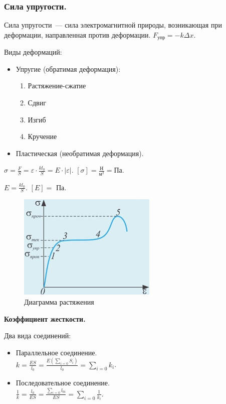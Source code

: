 \documentclass[12pt]{article}
\begin{document}
	\subsubsection{Сила упругости.}
	\begin{definition}
		Сила упругости~--- сила электромагнитной природы, возникающая при деформации, направленная против деформации. $F_{\text{упр}} = -k \varDelta x$.
	\end{definition}
	\begin{definition}
		Виды деформаций:
		\begin{itemize}
			\item Упругие (обратимая деформация):
			\begin{enumerate}
				\item Растяжение-сжатие
				\item Сдвиг
				\item Изгиб
				\item Кручение
			\end{enumerate}
			\item Пластическая (необратимая деформация).
		\end{itemize}
	\end{definition}
	\begin{definition}
		$\sigma = \frac{F}{S} = \varepsilon \cdot \frac{kl_0}{S} = E \cdot |\varepsilon|$. $[\sigma] = \frac{\text{Н}}{\text{м}^2} = \text{Па}$.
	\end{definition}
	\begin{definition}
		$E = \frac{kl_0}{S}$. $[E] =$ Па.
	\end{definition}
	\begin{figure}[H]
		\includegraphics[height=0.35\textwidth]{extra-materials/Диаграмма-растяжения}
		\caption{Диаграмма растяжения}
	\end{figure}
	\textbf{Коэффициент жесткости.}
	\begin{definition}
		Два вида соединений:
		\begin{itemize}
			\item Параллельное соединение. \\
			$k = \frac{ES}{l_0} = \frac{E(\sum_{i = 0} S_i)}{l_0} = \sum_{i = 0} k_i$.
			\item Последовательное соединение. \\
			$\frac{1}{k} = \frac{l_0}{ES} = \frac{\sum_{i = 0} l_{0i}}{ES} = \sum_{i = 0} \frac{1}{k_i}$.
		\end{itemize}
	\end{definition}
\end{document}
